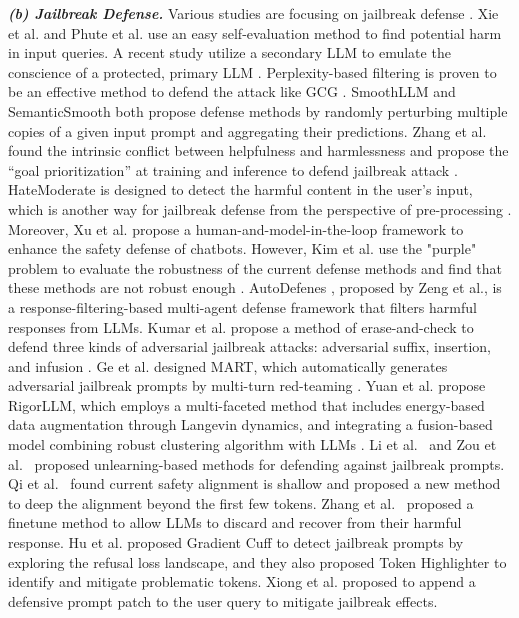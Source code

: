 \textbf{\textit{(b) Jailbreak Defense.}} Various studies are focusing on jailbreak defense \cite{lin2024figureoutanalyzingbasedjailbreak, jin2024jailbreakzoosurveylandscapeshorizons, Wallace2024TheIH, gao2024shaping}. Xie et al. \cite{xie2023defending} and Phute et al. \cite{phute2024llmselfdefenseself} use an easy self-evaluation method to find potential harm in input queries.
A recent study utilize a secondary LLM to emulate the conscience of a protected, primary LLM \cite{pisano2024bergeroncombatingadversarialattacks}. Perplexity-based filtering \cite{jain2023baseline, alon2023detecting} is proven to be an effective method to defend the attack like GCG \cite{zou2023universal}.
SmoothLLM \cite{smoothllm} and SemanticSmooth \cite{ji2024defendinglargelanguagemodels} both propose defense methods by randomly perturbing multiple copies of a given input prompt and aggregating their predictions. Zhang et al. found the intrinsic conflict between helpfulness and harmlessness 
and propose the ``goal prioritization'' at training and inference to defend jailbreak attack \cite{zhang2024defendinglargelanguagemodels}. HateModerate is designed to detect the harmful content in the user's input, which is another way for jailbreak defense from the perspective of pre-processing \cite{zheng-etal-2024-hatemoderate}. Moreover, Xu et al. \cite{xu2020recipes} propose a human-and-model-in-the-loop framework to enhance the safety defense of chatbots. However, Kim et al. use the "purple" problem to evaluate the robustness of the current defense methods and find that these methods are not robust enough \cite{kim2024jailbreaking}. AutoDefenes \cite{zeng2024autodefense}, proposed by Zeng et al., is a response-filtering-based multi-agent defense framework that filters harmful responses from LLMs. Kumar et al. propose a method of erase-and-check to defend three kinds of adversarial jailbreak attacks: adversarial suffix, insertion, and infusion \cite{kumar2023certifying}. Ge et al. designed MART, which automatically generates adversarial jailbreak prompts by multi-turn red-teaming \cite{ge2023mart}. Yuan et al. propose RigorLLM, which employs a multi-faceted method that includes energy-based data augmentation through Langevin dynamics, and integrating a fusion-based model combining robust clustering algorithm with LLMs \cite{yuan2024rigorllm}. Li et al.~\cite{li2024the} and Zou et al.~\cite{zou2024improving} proposed unlearning-based methods for defending against jailbreak prompts. Qi et al.~\cite{qi2024safety} found current safety alignment is shallow and proposed a new method to deep the alignment beyond the first few tokens. Zhang et al.~\cite{zhang2024backtracking} proposed a finetune method to allow LLMs to discard and recover from their harmful response. Hu et al. proposed Gradient Cuff \cite{hu2024gradient} to detect jailbreak prompts by exploring the refusal loss landscape, and they also proposed Token Highlighter \cite{hu2024token} to identify and mitigate problematic tokens. Xiong et al. proposed to append a defensive prompt patch \cite{xiong2024defensive} to the user query to mitigate jailbreak effects.


